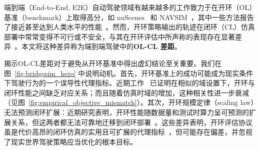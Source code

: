 \documentclass{article}
\begin{document}

端到端（End-to-End, E2E）自动驾驶领域有越来越多的工作致力于在开环（OL）基准（benchmark）上取得高分，如 nuScenes~\cite{caesar2020nuscenes} 和 NAVSIM~\cite{navsimv2, navsimv1}，其中一些方法报告了接近甚至达到人类水平的性能~\cite{RAP, DrivoR}。然而，开环策略输出的轨迹在闭环（CL）仿真部署中常常变得不可行或不安全，与其在开环评估中所声称的表现存在显著差异~\cite{jia2024bench, li2024ego, ol_cl_survey,zhao2025quantv2x}。本文将这种差异称为端到端驾驶中的\textbf{OL-CL 差距}。

揭示OL-CL差距对于避免从开环基准中得出虚幻结论至关重要。我们在图~\ref{fig:bridgesim_hero} 中说明动机。首先，开环基准上的成功可能成为现实条件下驾驶行为的一个误导性代理指标。近期工作~\cite{jia2024bench, li2024ego, ol_cl_survey} 已证明在相似的域设置下，开环与闭环性能之间缺乏对应关系；而且随着仿真时域的增加，这种相关性进一步衰减（见图~\ref{fig:empirical_objective_mismatch}）。其次，开环规模定律（scaling law）无法预测闭环扩展：近期研究表明，开环性能随数据量和测试时算力呈可预测的扩展关系，但这两者都无法可靠地迁移到闭环部署~\cite{zheng2024datascalinglaw, naumann2025datascalinglaw}。这些差异表明，开环评估协议虽是代价高昂的闭环仿真的实用且可扩展的代理指标~\cite{caesar2020nuscenes, caesar2021nuplan, navsimv1, navsimv2, li2024pretrain}，但可能存在偏差，并忽视了现实世界驾驶策略应当优化的根本目标。
\end{document}
